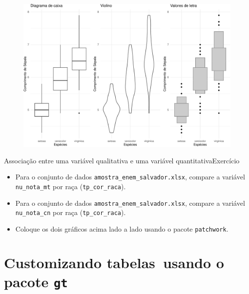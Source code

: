 \documentclass[
  10pt,
  ignorenonframetext,
]{beamer}
\providecommand{\tightlist}{%
  \setlength{\itemsep}{0pt}\setlength{\parskip}{0pt}}\usepackage{longtable,booktabs,array}
\begin{document}
\begin{frame}
\begin{figure}

{\centering \includegraphics[width=1\textwidth,height=\textheight]{exploracao-visualizacao_files/figure-beamer/unnamed-chunk-141-1.pdf}

}

\end{figure}
\end{frame}

\begin{frame}[fragile]{Associação entre uma variável qualitativa e uma
variável quantitativa\newline Exercício}
\protect\hypertarget{associauxe7uxe3o-entre-uma-variuxe1vel-qualitativa-e-uma-variuxe1vel-quantitativaexercuxedcio}{}
\begin{itemize}
\tightlist
\item
  Para o conjunto de dados \texttt{amostra\_enem\_salvador.xlsx},
  compare a variável \texttt{nu\_nota\_mt} por raça
  (\texttt{tp\_cor\_raca}).
\item
  Para o conjunto de dados \texttt{amostra\_enem\_salvador.xlsx},
  compare a variável \texttt{nu\_nota\_cn} por raça
  (\texttt{tp\_cor\_raca}).
\item
  Coloque os dois gráficos acima lado a lado usando o pacote
  \texttt{patchwork}.
\end{itemize}
\end{frame}

\hypertarget{customizando-tabelas-usando-o-pacote-gt}{%
\section{\texorpdfstring{Customizando tabelas\newline~usando o pacote
\texttt{gt}}{Customizando tabelas~usando o pacote gt}}\label{customizando-tabelas-usando-o-pacote-gt}}
\end{document}
